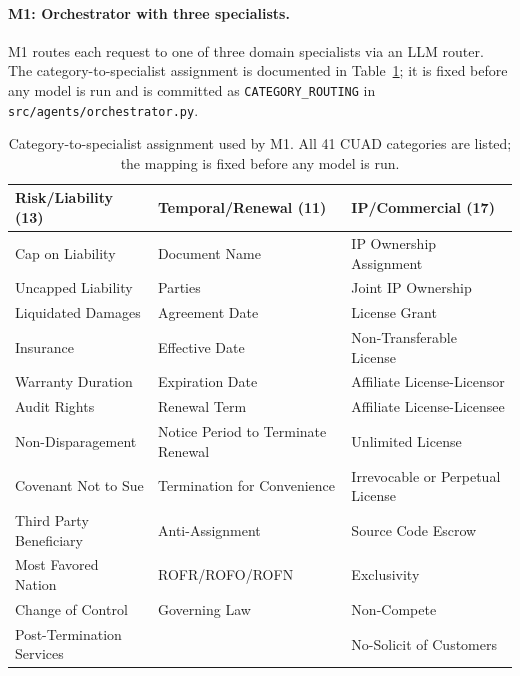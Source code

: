 \paragraph{M1: Orchestrator with three specialists.}
M1 routes each request to one of three domain specialists via an LLM router. The
category-to-specialist assignment is documented in Table~\ref{tab:specialist-map};
it is fixed before any model is run and is committed as \texttt{CATEGORY\_ROUTING}
in \texttt{src/agents/orchestrator.py}.

\begin{table}[h]
  \centering
  \footnotesize
  \caption{Category-to-specialist assignment used by M1. All 41 CUAD categories are
  listed; the mapping is fixed before any model is run.}
  \label{tab:specialist-map}
  \begin{tabular}{p{3.8cm} p{3.9cm} p{4.5cm}}
    \toprule
    \textbf{Risk/Liability (13)} &
    \textbf{Temporal/Renewal (11)} &
    \textbf{IP/Commercial (17)} \\
    \midrule
    Cap on Liability               & Document Name                     & IP Ownership Assignment \\
    Uncapped Liability             & Parties                           & Joint IP Ownership \\
    Liquidated Damages             & Agreement Date                    & License Grant \\
    Insurance                      & Effective Date                    & Non-Transferable License \\
    Warranty Duration              & Expiration Date                   & Affiliate License-Licensor \\
    Audit Rights                   & Renewal Term                      & Affiliate License-Licensee \\
    Non-Disparagement              & Notice Period to Terminate Renewal & Unlimited License \\
    Covenant Not to Sue            & Termination for Convenience       & Irrevocable or Perpetual License \\
    Third Party Beneficiary        & Anti-Assignment                   & Source Code Escrow \\
    Most Favored Nation            & ROFR/ROFO/ROFN                    & Exclusivity \\
    Change of Control              & Governing Law                     & Non-Compete \\
    Post-Termination Services      &                                   & No-Solicit of Customers \\

\end{tabular}
\end{table}
